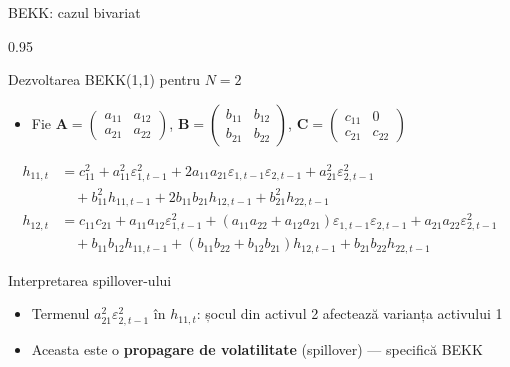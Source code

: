 \documentclass[9pt, aspectratio=169, t]{beamer}
\begin{document}
\begin{frame}{BEKK: cazul bivariat}
    \begin{cminipage}{0.95\textwidth}
    {\scriptsize
    \begin{block}{Dezvoltarea BEKK(1,1) pentru $N=2$}
        \begin{itemize}\setlength{\itemsep}{0pt}
            \item Fie $\mathbf{A} = \begin{pmatrix} a_{11} & a_{12} \\ a_{21} & a_{22} \end{pmatrix}$, $\mathbf{B} = \begin{pmatrix} b_{11} & b_{12} \\ b_{21} & b_{22} \end{pmatrix}$, $\mathbf{C} = \begin{pmatrix} c_{11} & 0 \\ c_{21} & c_{22} \end{pmatrix}$
        \end{itemize}
        \begin{align}
            h_{11,t} &= c_{11}^2 + a_{11}^2\varepsilon_{1,t-1}^2 + 2a_{11}a_{21}\varepsilon_{1,t-1}\varepsilon_{2,t-1} + a_{21}^2\varepsilon_{2,t-1}^2 \\
            &\quad + b_{11}^2 h_{11,t-1} + 2b_{11}b_{21}h_{12,t-1} + b_{21}^2 h_{22,t-1} \nonumber \\[3pt]
            h_{12,t} &= c_{11}c_{21} + a_{11}a_{12}\varepsilon_{1,t-1}^2 + (a_{11}a_{22}+a_{12}a_{21})\varepsilon_{1,t-1}\varepsilon_{2,t-1} + a_{21}a_{22}\varepsilon_{2,t-1}^2 \\
            &\quad + b_{11}b_{12}h_{11,t-1} + (b_{11}b_{22}+b_{12}b_{21})h_{12,t-1} + b_{21}b_{22}h_{22,t-1} \nonumber
        \end{align}
    \end{block}
    \begin{alertblock}{Interpretarea spillover-ului}
        \begin{itemize}\setlength{\itemsep}{0pt}
            \item Termenul $a_{21}^2\varepsilon_{2,t-1}^2$ în $h_{11,t}$: șocul din activul 2 afectează varianța activului 1
            \item Aceasta este o \textbf{propagare de volatilitate} (spillover) --- specifică BEKK
        \end{itemize}
    \end{alertblock}
    }
    \end{cminipage}
\end{frame}
\end{document}
